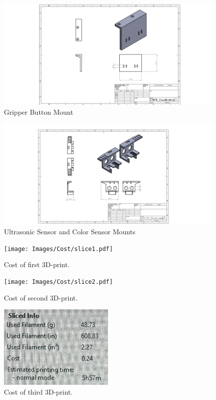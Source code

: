 \documentclass[12pt]{report}
\begin{document}
\begin{figure}[H]
    \centering
    \includegraphics[width=1\textwidth]{Images/3D prints/GRPR_DualButton_new.PNG}
    \caption{Gripper Button Mount}
    \label{fig:GRPR_DualButton}
\end{figure}

\begin{figure}[H]
    \centering
    \includegraphics[width=1\textwidth]{Images/3D prints/USS-CS_Dual_new.PNG}
    \caption{Ultrasonic Sensor and Color Sensor Mounts}
    \label{fig:USS-CS_Dual}
\end{figure}

\begin{figure}[H]
    \centering
    \texttt{[image: Images/Cost/slice1.pdf]}
    \caption{Cost of first 3D-print.}
    \label{fig:printcost1}
\end{figure}

\begin{figure}[H]
    \centering
    \texttt{[image: Images/Cost/slice2.pdf]}
    \caption{Cost of second 3D-print.}
    \label{fig:printcost2}
\end{figure}

\begin{figure}[H]
    \centering
    \includegraphics[width=0.5\textwidth]{Images/Cost/slice3.pdf}
    \caption{Cost of third 3D-print.}
    \label{fig:printcost3}
\end{figure}
\end{document}

